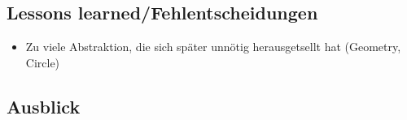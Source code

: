 \documentclass{article}
\begin{document}
\subsection{Lessons learned/Fehlentscheidungen}

\begin{itemize}
\item Zu viele Abstraktion, die sich später unnötig herausgetsellt hat (Geometry, Circle)
\end{itemize}

\subsection{Ausblick}

\nocite{*}

\printbibliography[maxnames=25]
\end{document}
